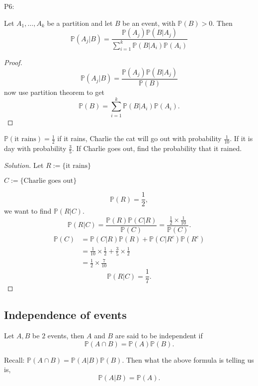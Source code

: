 \documentclass[10pt, a4paper]{article}
\begin{document}
P6:
\begin{theorem}
   Let $A_1, \dotsc, A_k$ be a partition and let $B$ be an event, with $\mathbb{P}(B) > 0$. Then
   \[
   \mathbb{P}(A_j | B) = \frac{\mathbb{P}(A_j)\mathbb{P}(B | A_j)}{\sum_{i = 1}^{k}\mathbb{P}(B | A_i)\mathbb{P}(A_i)}
   \]
   \begin{proof}
   \[
   \mathbb{P}(A_j | B) = \frac{\mathbb{P}(A_j)\mathbb{P}(B | A_j)}{\mathbb{P}(B)}
   \]
   now use partition theorem to get
   \[
   \mathbb{P}(B) = \sum_{i = 1}^{k}\mathbb{P}(B | A_i)\mathbb{P}(A_i).
   \]
   \end{proof}
\end{theorem}


\begin{example}
    $\mathbb{P}(\text{it rains}) = \frac{1}{2}$ if it rains, Charlie the cat will go out with probability $\frac{1}{10}$.
    If it is day with probability $\frac{3}{5}$.
    If Charlie goes out, find the probability that it rained.
    \begin{proof}[Solution]\renewcommand{\qedsymbol}{}
       Let $R := \{\text{it rains}\}$

       $C := \{\text{Charlie goes out}\}$

       \[
       \mathbb{P}(R) = \frac{1}{2},
       \]
       we want to find $\mathbb{P}(R | C)$.
       \[
       \mathbb{P}(R | C) = \frac{\mathbb{P}(R)\mathbb{P}(C | R)}{\mathbb{P}(C)} = \frac{\frac{1}{2} \times \frac{1}{10}}{\mathbb{P}(C)}.
       \]
       \begin{align*}
           \mathbb{P}(C) &= \mathbb{P}(C | R)\mathbb{P}( R) + \mathbb{P}(C | R ^ c)\mathbb{P}(R ^ c) \\
           &= \frac{1}{10} \times \frac{1}{2} + \frac{3}{5} \times \frac{1}{2} \\
           &= \frac{1}{2} \times \frac{7}{10}
       \end{align*}
       \[
       \mathbb{P}(R | C) = \frac{1}{7}.
       \]
    \end{proof}
\end{example}

\subsection{Independence of events}

\begin{definition}
    Let $A, B$ be $2$ events, then $A$ and $B$ are said to be independent if
    \[
    \mathbb{P}(A \cap B) = \mathbb{P}(A)\mathbb{P}(B).
    \]
\end{definition}
Recall: $\mathbb{P}(A \cap B) = \mathbb{P}(A | B)\mathbb{P}(B)$. Then what the above formula is telling us is,
\[
\mathbb{P}(A | B) = \mathbb{P}(A).
\]
\end{document}
